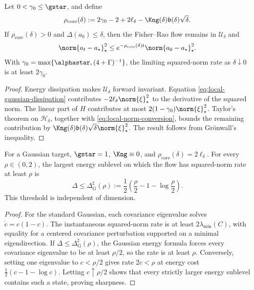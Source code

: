 \begin{theorem}
\label{thm:local-gaussian-core}
Let \(0<\gamma_0\leq\gstar\), and define
\begin{equation}
  \rho_{\mathrm{core}}(\delta)
  :=
  2\gamma_0-2+2\ell_\delta
  -\Kng(\delta)\mathfrak b(\delta)\sqrt\delta.
  \label{eq:local-core-rate}
\end{equation}
If \(\rho_{\mathrm{core}}(\delta)>0\) and
\(\Delta(a_0)\leq\delta\), then the Fisher--Rao flow remains in
\(\mathcal U_\delta\) and
\begin{equation}
  \norm{a_t-a_\star}_\star^2
  \leq
  e^{-\rho_{\mathrm{core}}(\delta)t}
  \norm{a_0-a_\star}_\star^2.
  \label{eq:local-core-contraction}
\end{equation}
With
\(\gamma_0=\max\{\alphastar,(4+\Gamma)^{-1}\}\), the limiting
squared-norm rate as \(\delta\downarrow0\) is at least
\(2\gamma_0\).
\end{theorem}

\begin{proof}
Energy dissipation makes \(\mathcal U_\delta\) forward invariant.
Equation \eqref{eq:local-gaussian-dissipation} contributes
\(-2\ell_\delta\norm{\xi}_\star^2\) to the derivative of the squared
norm.  The linear part of \(H\) contributes at most
\(2(1-\gamma_0)\norm{\xi}_\star^2\).  Taylor's theorem on
\(\mathcal H_\delta\), together with
\eqref{eq:local-norm-conversion}, bounds the remaining contribution by
\(\Kng(\delta)\mathfrak b(\delta)\sqrt\delta
\norm{\xi}_\star^2\).  The result follows from Gr\"onwall's inequality.
\end{proof}

\begin{corollary}
\label{cor:local-exact-gaussian-region}
For a Gaussian target, \(\gstar=1\), \(\Kng\equiv0\), and
\(\rho_{\mathrm{core}}(\delta)=2\ell_\delta\).  For every
\(\rho\in(0,2)\), the largest energy sublevel on which the flow has
squared-norm rate at least \(\rho\) is
\begin{equation}
  \Delta\leq
  \Delta_{\mathrm G}^{\sharp}(\rho)
  :=
  \frac12\left(
    \frac{\rho}{2}-1-\log\frac{\rho}{2}
  \right).
  \label{eq:local-exact-gaussian-threshold}
\end{equation}
This threshold is independent of dimension.
\end{corollary}

\begin{proof}
For the standard Gaussian, each covariance eigenvalue solves
\(\dot c=c(1-c)\).  The instantaneous squared-norm rate is at least
\(2\lambda_{\min}(C)\), with equality for a centered covariance perturbation
supported on a minimal eigendirection.  If
\(\Delta\leq\Delta_{\mathrm G}^{\sharp}(\rho)\), the Gaussian energy formula
forces every covariance eigenvalue to be at least \(\rho/2\), so the rate is
at least \(\rho\).  Conversely, setting one eigenvalue to
\(c<\rho/2\) gives rate \(2c<\rho\) at energy cost
\(\frac12(c-1-\log c)\).  Letting \(c\uparrow\rho/2\) shows that every
strictly larger energy sublevel contains such a state, proving sharpness.
\end{proof}

